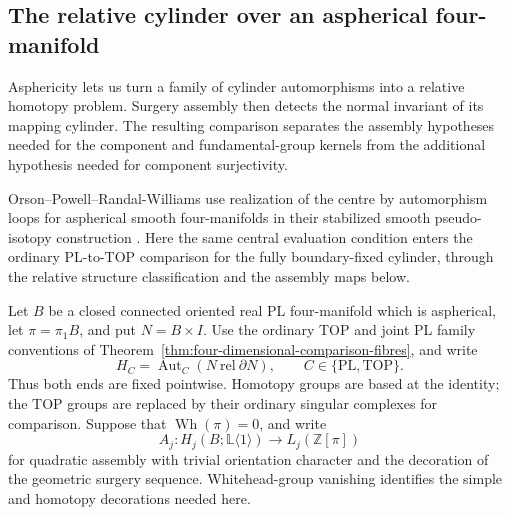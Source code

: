\subsection{The relative cylinder over an aspherical four-manifold}

Asphericity lets us turn a family of cylinder automorphisms into a
relative homotopy problem.  Surgery assembly then detects the normal
invariant of its mapping cylinder.  The resulting comparison separates
the assembly hypotheses needed for the component and fundamental-group
kernels from the additional hypothesis needed for component surjectivity.

Orson--Powell--Randal-Williams use realization of the centre by
automorphism loops for aspherical smooth four-manifolds in their
stabilized smooth pseudo-isotopy construction
\cite[Section~8.1, Remark~8.2 and Example~8.3, pp.~25--26;
Section~8.2, pp.~26--27]{OrsonPowellRandalWilliams2026}.
Here the same central evaluation condition enters the ordinary
PL-to-TOP comparison for the fully boundary-fixed cylinder, through
the relative structure classification and the assembly maps below.

Let $B$ be a closed connected oriented real PL four-manifold
which is aspherical, let $\pi=\pi_1B$, and put $N=B\times I$.
Use the ordinary TOP and joint PL family conventions of
Theorem~\ref{thm:four-dimensional-comparison-fibres}, and write
\[
 H_C=\operatorname{Aut}_C(N\ \mathrm{rel}\ \partial N),
 \qquad C\in\{\mathrm{PL},\mathrm{TOP}\}.
\]
Thus both ends are fixed pointwise.  Homotopy groups are
based at the identity; the TOP groups are replaced by
their ordinary singular complexes for comparison.
Suppose that $\operatorname{Wh}(\pi)=0$, and write
\begin{equation}\label{eq:aspherical-four-assembly}
 A_j:H_j(B;\mathbb L\langle1\rangle)
                   \longrightarrow L_j(\mathbb Z[\pi])
\end{equation}
for quadratic assembly with trivial orientation character
and the decoration of the geometric surgery sequence.
Whitehead-group vanishing identifies the simple and
homotopy decorations needed here.

